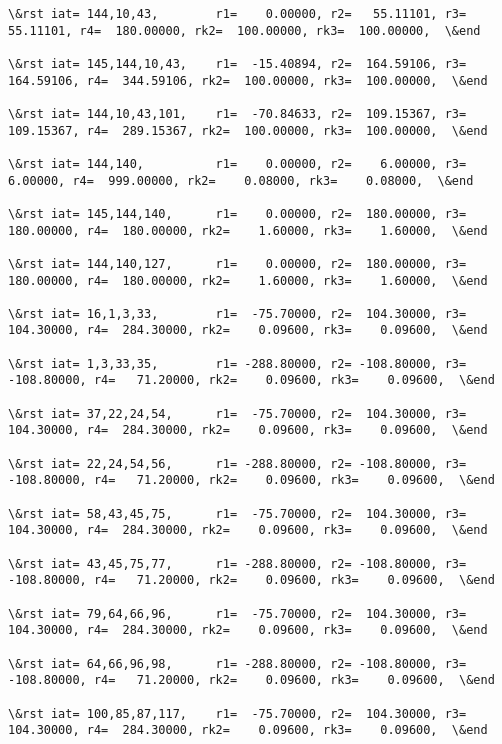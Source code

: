 \documentclass[11pt]{article}
\begin{document}
\begin{Verbatim}[commandchars=\\\{\}]
\&rst iat= 144,10,43,        r1=    0.00000, r2=   55.11101, r3=   55.11101, r4=  180.00000, rk2=  100.00000, rk3=  100.00000,  \&end

\&rst iat= 145,144,10,43,    r1=  -15.40894, r2=  164.59106, r3=  164.59106, r4=  344.59106, rk2=  100.00000, rk3=  100.00000,  \&end

\&rst iat= 144,10,43,101,    r1=  -70.84633, r2=  109.15367, r3=  109.15367, r4=  289.15367, rk2=  100.00000, rk3=  100.00000,  \&end

\&rst iat= 144,140,          r1=    0.00000, r2=    6.00000, r3=    6.00000, r4=  999.00000, rk2=    0.08000, rk3=    0.08000,  \&end

\&rst iat= 145,144,140,      r1=    0.00000, r2=  180.00000, r3=  180.00000, r4=  180.00000, rk2=    1.60000, rk3=    1.60000,  \&end

\&rst iat= 144,140,127,      r1=    0.00000, r2=  180.00000, r3=  180.00000, r4=  180.00000, rk2=    1.60000, rk3=    1.60000,  \&end

\&rst iat= 16,1,3,33,        r1=  -75.70000, r2=  104.30000, r3=  104.30000, r4=  284.30000, rk2=    0.09600, rk3=    0.09600,  \&end

\&rst iat= 1,3,33,35,        r1= -288.80000, r2= -108.80000, r3= -108.80000, r4=   71.20000, rk2=    0.09600, rk3=    0.09600,  \&end

\&rst iat= 37,22,24,54,      r1=  -75.70000, r2=  104.30000, r3=  104.30000, r4=  284.30000, rk2=    0.09600, rk3=    0.09600,  \&end

\&rst iat= 22,24,54,56,      r1= -288.80000, r2= -108.80000, r3= -108.80000, r4=   71.20000, rk2=    0.09600, rk3=    0.09600,  \&end

\&rst iat= 58,43,45,75,      r1=  -75.70000, r2=  104.30000, r3=  104.30000, r4=  284.30000, rk2=    0.09600, rk3=    0.09600,  \&end

\&rst iat= 43,45,75,77,      r1= -288.80000, r2= -108.80000, r3= -108.80000, r4=   71.20000, rk2=    0.09600, rk3=    0.09600,  \&end

\&rst iat= 79,64,66,96,      r1=  -75.70000, r2=  104.30000, r3=  104.30000, r4=  284.30000, rk2=    0.09600, rk3=    0.09600,  \&end

\&rst iat= 64,66,96,98,      r1= -288.80000, r2= -108.80000, r3= -108.80000, r4=   71.20000, rk2=    0.09600, rk3=    0.09600,  \&end

\&rst iat= 100,85,87,117,    r1=  -75.70000, r2=  104.30000, r3=  104.30000, r4=  284.30000, rk2=    0.09600, rk3=    0.09600,  \&end


\end{Verbatim}
\end{document}
